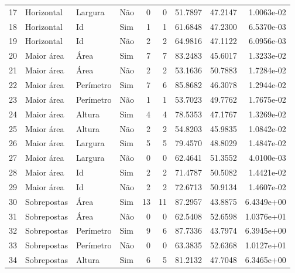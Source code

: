 \begin{tabular}{rlllrrrrr}
17 & Horizontal  & Largura   & Não         & 0        & 0       & 51.7897      & 47.2147  & 1.0063e-02 \\
18 & Horizontal  & Id        & Sim         & 1        & 1       & 61.6848      & 47.2300  & 6.5370e-03 \\
19 & Horizontal  & Id        & Não         & 2        & 2       & 64.9816      & 47.1122  & 6.0956e-03 \\
20 & Maior área  & Área      & Sim         & 7        & 7       & 83.2483      & 45.6017  & 1.3233e-02 \\
21 & Maior área  & Área      & Não         & 2        & 2       & 53.1636      & 50.7883  & 1.7284e-02 \\
22 & Maior área  & Perímetro & Sim         & 7        & 6       & 85.8682      & 46.3078  & 1.2944e-02 \\
23 & Maior área  & Perímetro & Não         & 1        & 1       & 53.7023      & 49.7762  & 1.7675e-02 \\
24 & Maior área  & Altura    & Sim         & 4        & 4       & 78.5353      & 47.1767  & 1.3269e-02 \\
25 & Maior área  & Altura    & Não         & 2        & 2       & 54.8203      & 45.9835  & 1.0842e-02 \\
26 & Maior área  & Largura   & Sim         & 5        & 5       & 79.4570      & 48.8029  & 1.4847e-02 \\
27 & Maior área  & Largura   & Não         & 0        & 0       & 62.4641      & 51.3552  & 4.0100e-03 \\
28 & Maior área  & Id        & Sim         & 2        & 2       & 71.4787      & 50.5082  & 1.4421e-02 \\
29 & Maior área  & Id        & Não         & 2        & 2       & 72.6713      & 50.9134  & 1.4607e-02 \\
30 & Sobrepostas & Área      & Sim         & 13       & 11      & 87.2957      & 43.8875  & 6.4349e+00 \\
31 & Sobrepostas & Área      & Não         & 0        & 0       & 62.5408      & 52.6598  & 1.0376e+01 \\
32 & Sobrepostas & Perímetro & Sim         & 9        & 6       & 87.7336      & 43.7974  & 6.3945e+00 \\
33 & Sobrepostas & Perímetro & Não         & 0        & 0       & 63.3835      & 52.6368  & 1.0127e+01 \\
34 & Sobrepostas & Altura    & Sim         & 6        & 5       & 81.2132      & 47.7048  & 6.3465e+00 \\

\end{tabular}
